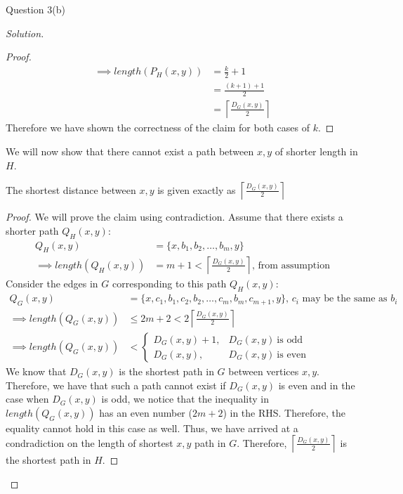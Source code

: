 \begin{solution}{Question 3(b)}
\begin{proof}[Solution]
\begin{proof}
\begin{equation}
\begin{split}
            \implies length(P_H(x, y)) &= \frac{k}{2} + 1\\
                                       &= \frac{(k + 1) + 1}{2}\\
                                       &= \left\lceil\frac{D_G(x, y)}{2}\right\rceil
          \end{split}
        \end{equation}
        Therefore we have shown the correctness of the claim for both cases of $k$.
      \end{proof}
      We will now show that there cannot exist a path between $x, y$ of shorter length in $H$.
      \begin{claim}\label{claim:DhContradiction}
        The shortest distance between $x, y$ is given exactly as $\left\lceil\frac{D_G(x, y)}{2}\right\rceil$
      \end{claim}
      \begin{proof}
        We will prove the claim using contradiction. Assume that there exists a shorter path $Q_H(x, y)$:
        \begin{equation}
          \begin{split}
            Q_H(x, y) &= \{x, b_1, b_2, \ldots, b_m, y\}\\
            \implies length(Q_H(x, y)) &= m + 1 < \left\lceil\frac{D_G(x, y)}{2}\right\rceil\text{, from assumption}
          \end{split}
        \end{equation}
        Consider the edges in $G$ corresponding to this path $Q_H(x, y)$:
        \begin{equation}
          \begin{split}
            Q_G(x, y) &= \{x, c_1, b_1, c_2, b_2, \ldots, c_m, b_m, c_{m+1}, y\}\text{, $c_i$ may be the same as $b_i$}\\
            \implies length(Q_G(x, y)) &\leq 2m + 2 < 2 \left\lceil\frac{D_G(x, y)}{2}\right\rceil\\
            \implies length(Q_G(x, y)) &< \begin{cases}
              D_G(x, y) + 1, & D_G(x, y)\ \text{is odd}\\
              D_G(x, y), & D_G(x, y)\ \text{is even}
            \end{cases}
          \end{split}
        \end{equation}
        We know that $D_G(x, y)$ is the shortest path in $G$ between vertices $x, y$. Therefore, we have that such a path cannot exist if $D_G(x, y)$ is even and in the case when $D_G(x, y)$ is odd, we notice that the inequality in $length(Q_G(x, y))$ has an even number ($2m+2$) in the RHS\@. Therefore, the equality cannot hold in this case as well. Thus, we have arrived at a condradiction on the length of shortest $x, y$ path in $G$. Therefore, $\left\lceil\frac{D_G(x, y)}{2}\right\rceil$ is the shortest path in $H$.

\end{proof}
\end{proof}
\end{solution}

